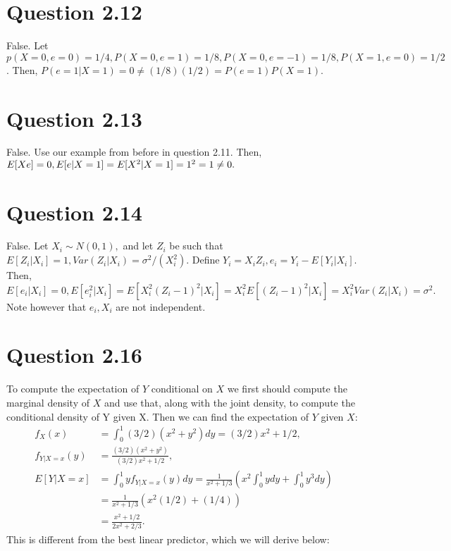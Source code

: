 \documentclass[11pt]{article} %
\begin{document}
\section{Question 2.12}
False. Let $p(X=0,e=0) = 1/4, P(X=0,e=1) = 1/8, P(X=0,e=-1) = 1/8,P(X=1,e=0) = 1/2$. Then, $P(e=1|X=1) = 0 \neq (1/8)(1/2) = P(e=1)P(X=1)$.
\section{Question 2.13}
False. Use our example from before in question 2.11. Then, $E[Xe] = 0,E[e|X=1] \\= E[X^2|X=1] = 1^2 = 1\neq 0.$
\section{Question 2.14}
False. Let $X_i \sim N(0,1),$ and let $Z_i$ be such that $E[Z_i|X_i ]=1,Var(Z_i|X_i) = \sigma^2/(X_i^2).$ Define $Y_i = X_iZ_i,e_i = Y_i - E[Y_i|X_i].$ Then, $E[e_i|X_i] = 0,E[e_i^2|X_i] = E[X_i^2(Z_i - 1)^2|X_i] = X_i^2E[(Z_i - 1)^2|X_i] = X_i^2Var(Z_i|X_i) = \sigma^2.$ Note however that $e_i,X_i$ are not independent.

\section{Question 2.16}

To compute the expectation of $Y$ conditional on $X$ we first should compute the marginal density of $X$ and use that, along with the joint density, to compute the conditional density of Y given X. Then we can find the expectation of $Y$ given $X$:
\begin{align*}
f_X(x) &= \int_{0}^{1}(3/2)(x^2 +y^2)dy = (3/2)x^2 + 1/2,\\
f_{Y|X=x}(y) &= \frac{(3/2)(x^2 +y^2)}{(3/2)x^2 + 1/2},\\
E[Y|X=x] &= \int_{0}^1 yf_{Y|X=x}(y)dy = \frac{1}{x^2+1/3}(x^2\int_0^1 ydy + \int_0^1y^3dy) \\
&=  \frac{1}{x^2+1/3}(x^2(1/2) + (1/4)) \\
&= \frac{x^2+1/2}{2x^2+ 2/3}. 
\end{align*}
This is different from the best linear predictor, which we will derive below:
\end{document}
